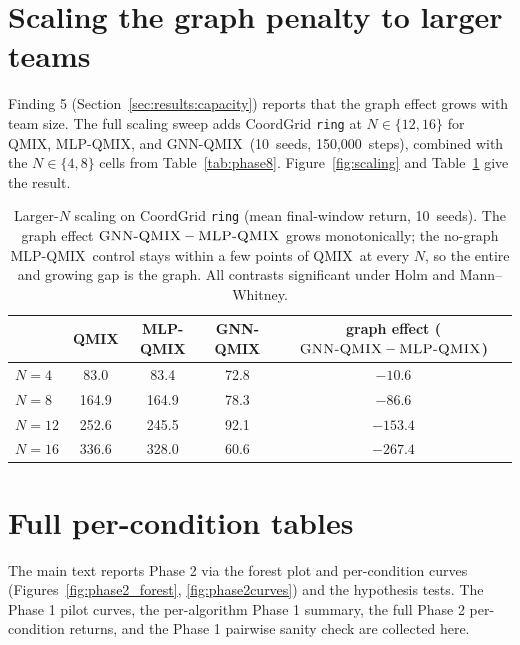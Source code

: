 \documentclass[manuscript, screen, review]{jair}
\newcommand{\algoname}[1]{\textsc{#1}}
\newcommand{\qmix}{\algoname{QMIX}}
\newcommand{\gnnqmix}{\algoname{GNN-QMIX}}
\newcommand{\mlpqmix}{\algoname{MLP-QMIX}}
\newcommand{\PEsteps}{150{,}000}      %
\newcommand{\PEseeds}{10}             %
\newcommand{\PSgapNfour}{-10.6}       %
\newcommand{\PSgapNeight}{-86.6}      %
\newcommand{\PSgapNtwelve}{-153.4}    %
\newcommand{\PSgapNsixteen}{-267.4}   %
\newcommand{\PSgnnNsixteen}{60.6}     %
\begin{document}
\section{Scaling the graph penalty to larger teams}
\label{app:scaling}

Finding 5 (Section~\ref{sec:results:capacity}) reports that the graph
effect grows with team size. The full scaling sweep adds CoordGrid
\texttt{ring} at $N\in\{12,16\}$ for \qmix, \mlpqmix, and \gnnqmix\
(\PEseeds\ seeds, \PEsteps\ steps), combined with the $N\in\{4,8\}$ cells
from Table~\ref{tab:phase8}. Figure~\ref{fig:scaling} and
Table~\ref{tab:scaling} give the result.


\begin{table}[!ht]
  \centering
  \small
  \caption{Larger-$N$ scaling on CoordGrid \texttt{ring} (mean final-window
  return, \PEseeds\ seeds). The graph effect $\gnnqmix-\mlpqmix$ grows
  monotonically; the no-graph \mlpqmix\ control stays within a few points of
  \qmix\ at every $N$, so the entire and growing gap is the graph. All
  contrasts significant under Holm and Mann--Whitney.}
  \label{tab:scaling}
  \begin{tabular}{lcccc}
    \toprule
    & \qmix & \mlpqmix & \gnnqmix & graph effect ($\gnnqmix-\mlpqmix$) \\
    \midrule
    $N=4$  & 83.0 & 83.4 & 72.8 & $\PSgapNfour$ \\
    $N=8$  & 164.9 & 164.9 & 78.3 & $\PSgapNeight$ \\
    $N=12$ & 252.6 & 245.5 & 92.1 & $\PSgapNtwelve$ \\
    $N=16$ & 336.6 & 328.0 & \PSgnnNsixteen & $\PSgapNsixteen$ \\
    \bottomrule
  \end{tabular}
\end{table}

\section{Full per-condition tables}
\label{app:fulltables}

The main text reports Phase 2 via the forest plot and per-condition curves
(Figures~\ref{fig:phase2_forest}, \ref{fig:phase2curves}) and the
hypothesis tests. The Phase 1 pilot curves, the per-algorithm Phase 1
summary, the full Phase 2 per-condition returns, and the Phase 1 pairwise
sanity check are collected here.
\end{document}
